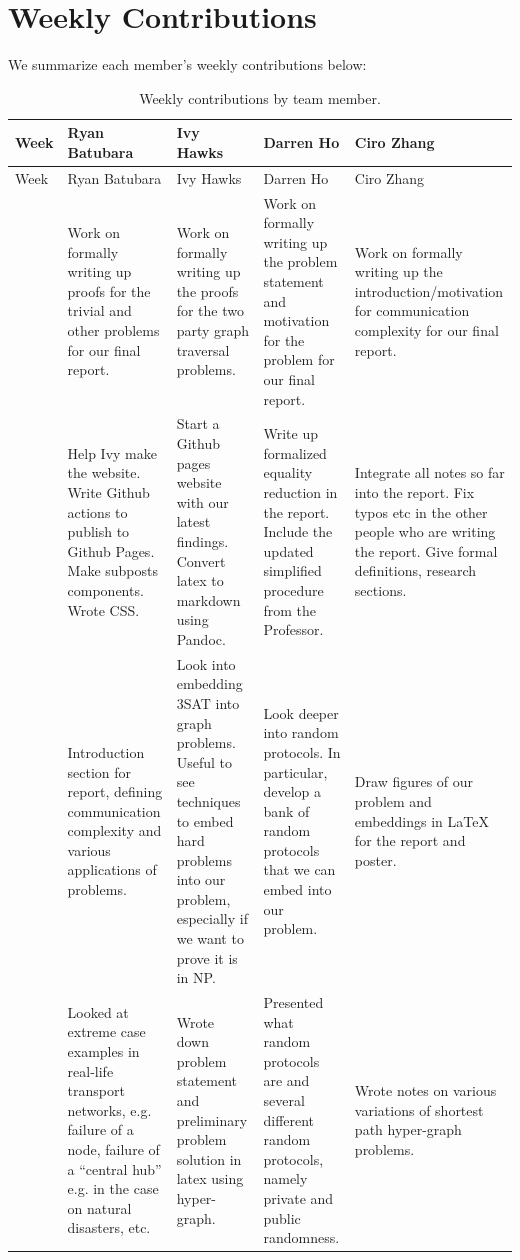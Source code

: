 \section{Weekly Contributions}

We summarize each member's weekly contributions below:

\small
\setlength{\tabcolsep}{4pt}
\begin{longtable}{@{}>{\raggedright\arraybackslash}p{}>{\raggedright\arraybackslash}p{}>{\raggedright\arraybackslash}p{}>{\raggedright\arraybackslash}p{}>{\raggedright\arraybackslash}p{}@{}}
\caption{Weekly contributions by team member.}
\toprule
Week & Ryan Batubara & Ivy Hawks & Darren Ho & Ciro Zhang \\
\midrule
\endfirsthead
\toprule
Week & Ryan Batubara & Ivy Hawks & Darren Ho & Ciro Zhang \\
\midrule
\endhead
\bottomrule
\endfoot
\bottomrule
\endlastfoot
6 & Work on formally writing up proofs for the trivial and other problems for our final report. & Work on formally writing up the proofs for the two party graph traversal problems. & Work on formally writing up the problem statement and motivation for the problem for our final report. & Work on formally writing up the introduction/motivation for communication complexity for our final report. \\
5 & Help Ivy make the website. Write Github actions to publish to Github Pages. Make subposts components. Wrote CSS. & Start a Github pages website with our latest findings. Convert latex to markdown using Pandoc. & Write up formalized equality reduction in the report. Include the updated simplified procedure from the Professor. & Integrate all notes so far into the report. Fix typos etc in the other people who are writing the report. Give formal definitions, research sections. \\
4 & Introduction section for report, defining communication complexity and various applications of problems. & Look into embedding 3SAT into graph problems. Useful to see techniques to embed hard problems into our problem, especially if we want to prove it is in NP. & Look deeper into random protocols. In particular, develop a bank of random protocols that we can embed into our problem. & Draw figures of our problem and embeddings in LaTeX for the report and poster. \\
3 & Looked at extreme case examples in real-life transport networks, e.g. failure of a node, failure of a ``central hub'' e.g. in the case on natural disasters, etc. & Wrote down problem statement and preliminary problem solution in latex using hyper-graph. & Presented what random protocols are and several different random protocols, namely private and public randomness. & Wrote notes on various variations of shortest path hyper-graph problems. \\

\end{longtable}
